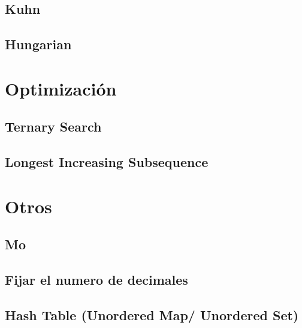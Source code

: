 \documentclass[a4paper,11pt,landscape,twocolumn]{article}
\begin{document}


\subsection{Kuhn}



\subsection{Hungarian}



\section{Optimización}

\subsection{Ternary Search}



\subsection{Longest Increasing Subsequence}



\section{Otros}

\subsection{Mo}



\subsection{Fijar el numero de decimales}



\subsection{Hash Table (Unordered Map/ Unordered Set)}
\end{document}
